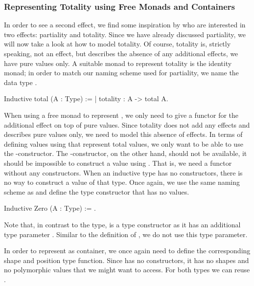 \subsubsection{Representing Totality using Free Monads and Containers}
\label{subsub:totality_container}
In order to see a second effect, we find some inspiration by \citet{abel2005verifying} who are interested in two effects: partiality and totality.
Since we have already discussed partiality, we will now take a look at how to model totality.
Of course, totality is, strictly speaking, not an effect, but describes the absence of any additional effects, we have pure values only.
A suitable monad to represent totality is the identity monad; in order to match our naming scheme used for partiality, we name the data type .

\begin{coqcode}
Inductive total (A : Type) :=
| totality : A -> total A.
\end{coqcode}

When using a free monad to represent , we only need to give a functor for the additional effect on top of pure values.
Since totality does not add any effects and describes pure values only, we need to model this absence of effects.
In terms of defining values using  that represent total values, we only want to be able to use the \--constructor.
The \--constructor, on the other hand, should not be available, it should be impossible to construct a value using .
That is, we need a functor without any constructors.
When an inductive type has no constructors, there is no way to construct a value of that type.
Once again, we use the same naming scheme as \citet{swierstra2008data} and define the type constructor  that has no values.

\begin{coqcode}
Inductive Zero (A : Type) := .
\end{coqcode}

Note that, in contrast to the  type,  is a type constructor as it has an additional type parameter .
Similar to the definition of , we do not use this type parameter.

In order to represent  as container, we once again need to define the corresponding shape and position type function.
Since  has no constructors, it has no shapes and no polymorphic values that we might want to access.
For both types we can reuse .

